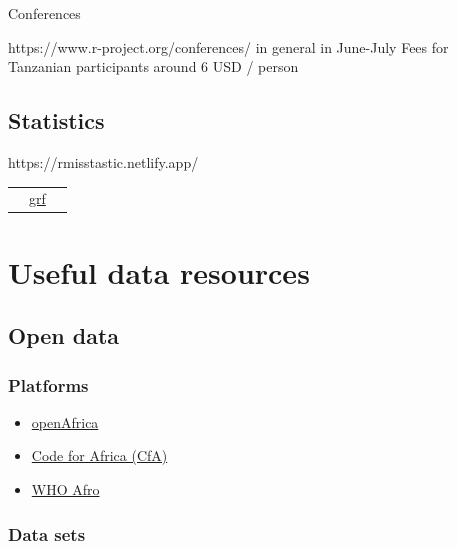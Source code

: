 \documentclass[
  letterpaper,
  DIV=11,
  numbers=noendperiod,
  oneside]{scrreprt}
\begin{document}
Conferences

https://www.r-project.org/conferences/ in general in June-July Fees for
Tanzanian participants around 6 USD / person

\hypertarget{statistics}{%
\section{Statistics}\label{statistics}}

https://rmisstastic.netlify.app/

\begin{longtable}[]{@{}
  >{\raggedright\arraybackslash}p{}
  >{\raggedright\arraybackslash}p{}
  >{\raggedright\arraybackslash}p{}@{}}
\toprule\noalign{}
\endhead
\bottomrule\noalign{}
\endlastfoot
& \href{https://grf-labs.github.io/grf/}{grf} & \\
\end{longtable}

\hypertarget{sec-data-resources}{%
\chapter{Useful data resources}\label{sec-data-resources}}

\hypertarget{open-data}{%
\section{Open data}\label{open-data}}

\hypertarget{platforms}{%
\subsection{Platforms}\label{platforms}}

\begin{itemize}
\item
  \href{https://open.africa/}{openAfrica}
\item
  \href{https://github.com/CodeForAfrica/}{Code for Africa (CfA)}
\item
  \href{https://aho.afro.who.int/data-and-statistics/}{WHO Afro}
\end{itemize}

\hypertarget{data-sets}{%
\subsection{Data sets}\label{data-sets}}
\end{document}
